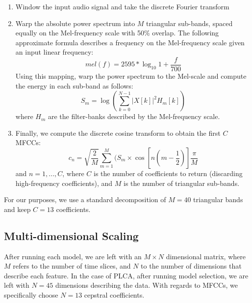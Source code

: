 \begin{enumerate}[noitemsep]
\item Window the input audio signal and take the discrete Fourier transform
\item Warp the absolute power spectrum into $M$ triangular sub-bands, spaced equally on the Mel-frequency scale with 50\% overlap.  The following approximate formula describes a frequency on the Mel-frequency scale given an input linear frequency:
\begin{equation}
mel(f) = 2595*\log_{10}{1+\frac{f}{700}}
\end{equation}
Using this mapping, warp the power spectrum to the Mel-scale and compute the energy in each sub-band as follows:
\begin{equation}
S_m = \log{\left(\sum_{k=0}^{N-1}|X[k]|^2H_m[k]\right)}
\end{equation}
where $H_m$ are the filter-banks described by the Mel-frequency scale.
\item Finally, we compute the discrete cosine transform to obtain the first $C$ MFCCs:
\begin{equation}
c_n = \sqrt{\frac{2}{M}}\sum_{m=1}^{M}(S_m\times\cos{[n(m-\frac{1}{2})]}\frac{\pi}{M}
\end{equation}
and $n = 1,...,C$, where $C$ is the number of coefficients to return (discarding high-frequency coefficients), and $M$ is the number of triangular sub-bands.
\end{enumerate}

For our purposes, we use a standard decomposition of $M=40$ triangular bands and keep $C=13$ coefficients.

\subsection{Multi-dimensional Scaling}
After running each model, we are left with an $M \times N$ dimensional matrix, where $M$ refers to the number of time slices, and $N$ to the number of dimensions that describe each feature.  In the case of PLCA, after running model selection, we are left with $N=45$ dimensions describing the data.  With regards to MFCCs, we specifically choose $N=13$ cepstral coefficients.  

